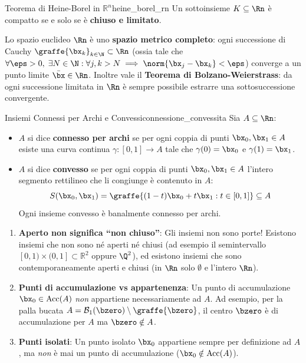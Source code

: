 \begin{teorema}{Teorema di Heine-Borel in $\mathbb{R}^n$}{heine_borel_rn}
Un sottoinsieme $K \subseteq \Rn$ è compatto se e solo se è \textbf{chiuso e limitato}.
\end{teorema}

\begin{osservazione}
Lo spazio euclideo $\Rn$ è uno \textbf{spazio metrico completo}: ogni successione di Cauchy $\graffe{\bx_k}_{k \in \N} \subset \Rn$ (ossia tale che $\forall \eps > 0, \; \exists N \in \N : \forall j, k > N \implies \norm{\bx_j - \bx_k} < \eps$) converge a un punto limite $\bar{\bx} \in \Rn$.
Inoltre vale il \textbf{Teorema di Bolzano-Weierstrass}: da ogni successione limitata in $\Rn$ è sempre possibile estrarre una sottosuccessione convergente.
\end{osservazione}

\begin{definizione}{Insiemi Connessi per Archi e Convessi}{connessione_convessita}
Sia $A \subseteq \Rn$:
\begin{itemize}
    \item $A$ si dice \textbf{connesso per archi} se per ogni coppia di punti $\bx_0, \bx_1 \in A$ esiste una curva continua $\gamma: [0, 1] \to A$ tale che $\gamma(0) = \bx_0$ e $\gamma(1) = \bx_1$.
    \item $A$ si dice \textbf{convesso} se per ogni coppia di punti $\bx_0, \bx_1 \in A$ l'intero segmento rettilineo che li congiunge è contenuto in $A$:
    \[
    S(\bx_0, \bx_1) = \graffe{(1-t)\bx_0 + t\bx_1 : t \in [0, 1]} \subseteq A
    \]
    Ogni insieme convesso è banalmente connesso per archi.
\end{itemize}
\end{definizione}

\begin{esame}
\begin{enumerate}
    \item \textbf{Aperto non significa ``non chiuso''}: Gli insiemi non sono porte! Esistono insiemi che non sono né aperti né chiusi (ad esempio il semintervallo $[0, 1) \times (0, 1] \subset \mathbb{R}^2$ oppure $\Q^2$), ed esistono insiemi che sono contemporaneamente aperti e chiusi (in $\Rn$ solo $\emptyset$ e l'intero $\Rn$).
    \item \textbf{Punti di accumulazione vs appartenenza}: Un punto di accumulazione $\bx_0 \in \operatorname{Acc}(A)$ \textit{non} appartiene necessariamente ad $A$. Ad esempio, per la palla bucata $A = \mathcal{B}_1(\bzero) \setminus \graffe{\bzero}$, il centro $\bzero$ è di accumulazione per $A$ ma $\bzero \notin A$.
    \item \textbf{Punti isolati}: Un punto isolato $\bx_0$ appartiene sempre per definizione ad $A$, ma \textit{non} è mai un punto di accumulazione ($\bx_0 \notin \operatorname{Acc}(A)$).
\end{enumerate}
\end{esame}

